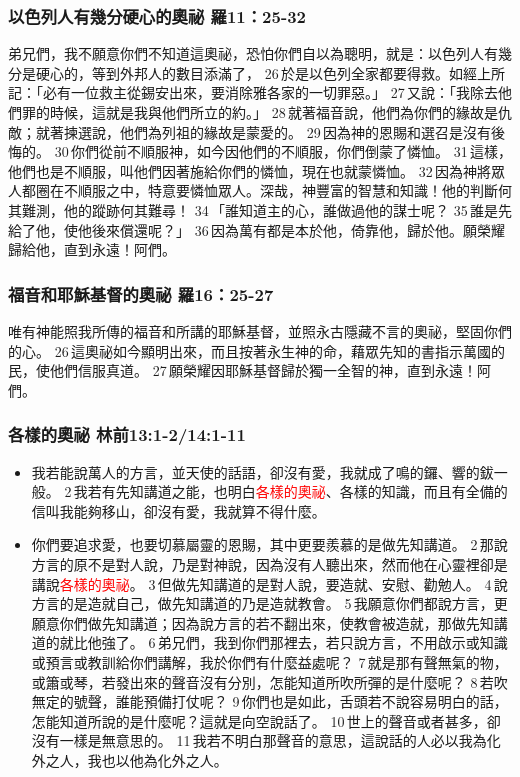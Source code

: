 \subsubsection{以色列人有幾分硬心的奧祕 羅11：25-32}
弟兄們，我不願意你們不知道這奧祕，恐怕你們自以為聰明，就是：以色列人有幾分是硬心的，等到外邦人的數目添滿了， 26 於是以色列全家都要得救。如經上所記：「必有一位救主從錫安出來，要消除雅各家的一切罪惡。」 27 又說：「我除去他們罪的時候，這就是我與他們所立的約。」 28 就著福音說，他們為你們的緣故是仇敵；就著揀選說，他們為列祖的緣故是蒙愛的。 29 因為神的恩賜和選召是沒有後悔的。 30 你們從前不順服神，如今因他們的不順服，你們倒蒙了憐恤。 31 這樣，他們也是不順服，叫他們因著施給你們的憐恤，現在也就蒙憐恤。 32 因為神將眾人都圈在不順服之中，特意要憐恤眾人。深哉，神豐富的智慧和知識！他的判斷何其難測，他的蹤跡何其難尋！ 34 「誰知道主的心，誰做過他的謀士呢？ 35 誰是先給了他，使他後來償還呢？」 36 因為萬有都是本於他，倚靠他，歸於他。願榮耀歸給他，直到永遠！阿們。


\subsubsection{福音和耶穌基督的奧祕 羅16：25-27}
唯有神能照我所傳的福音和所講的耶穌基督，並照永古隱藏不言的奧祕，堅固你們的心。 26 這奧祕如今顯明出來，而且按著永生神的命，藉眾先知的書指示萬國的民，使他們信服真道。 27 願榮耀因耶穌基督歸於獨一全智的神，直到永遠！阿們。


\subsubsection{各樣的奧祕 林前13:1-2/14:1-11}
\begin{itemize}
\item 我若能說萬人的方言，並天使的話語，卻沒有愛，我就成了鳴的鑼、響的鈸一般。 2 我若有先知講道之能，也明白\textcolor{red}{各樣的奧祕}、各樣的知識，而且有全備的信叫我能夠移山，卻沒有愛，我就算不得什麼。
\item 你們要追求愛，也要切慕屬靈的恩賜，其中更要羨慕的是做先知講道。 2 那說方言的原不是對人說，乃是對神說，因為沒有人聽出來，然而他在心靈裡卻是講說\textcolor{red}{各樣的奧祕}。 3 但做先知講道的是對人說，要造就、安慰、勸勉人。 4 說方言的是造就自己，做先知講道的乃是造就教會。 5 我願意你們都說方言，更願意你們做先知講道；因為說方言的若不翻出來，使教會被造就，那做先知講道的就比他強了。 6 弟兄們，我到你們那裡去，若只說方言，不用啟示或知識或預言或教訓給你們講解，我於你們有什麼益處呢？ 7 就是那有聲無氣的物，或簫或琴，若發出來的聲音沒有分別，怎能知道所吹所彈的是什麼呢？ 8 若吹無定的號聲，誰能預備打仗呢？ 9 你們也是如此，舌頭若不說容易明白的話，怎能知道所說的是什麼呢？這就是向空說話了。 10 世上的聲音或者甚多，卻沒有一樣是無意思的。 11 我若不明白那聲音的意思，這說話的人必以我為化外之人，我也以他為化外之人。
\end{itemize}


